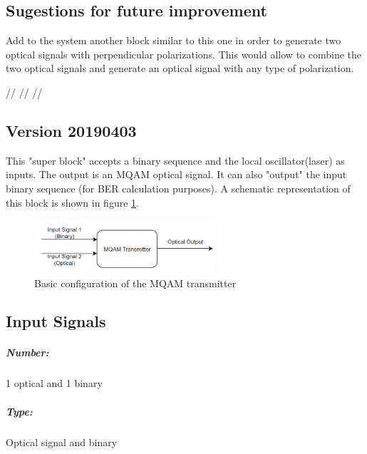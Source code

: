 \subsection*{Sugestions for future improvement}

Add to the system another block similar to this one in order to generate two optical signals with perpendicular polarizations. This would allow to combine the two optical signals and generate an optical signal with any type of polarization.

//%
//%
//%

 \subsection*{\textbf{Version 20190403}}


This "super block" accepts a binary sequence and the local oscillator(laser) as inputs. The output is an MQAM optical signal. It can also "output" the input binary sequence (for BER calculation purposes). A schematic representation of this block is shown in figure \ref{MQAM_transmitter_block_diagram_simple}.

\begin{figure}[H]
	\centering
	\includegraphics[width=0.6\textwidth]{./lib/m_qam_transmitter/figures/MQAM_transmitter_block_diagram_simple3}
	\caption{Basic configuration of the MQAM transmitter}\label{MQAM_transmitter_block_diagram_simple}
\end{figure}
\subsection*{Input Signals}

\subparagraph*{Number:} 1 optical and 1 binary

\subparagraph*{Type:} Optical signal and binary

